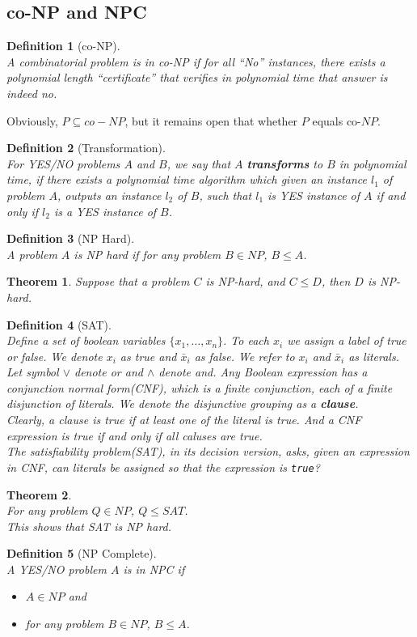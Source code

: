 \documentclass[12pt]{article}
\newtheorem{definition}{Definition}[section]
\newtheorem{theorem}{Theorem}[section]
\theoremstyle{definition}
\begin{document}
\subsection{co-NP and NPC}
\begin{definition}[co-NP]
\hfill\\\normalfont A combinatorial problem is in co-NP if for all ``No'' instances, there exists a polynomial length ``certificate'' that verifies in polynomial time that answer is indeed no. 
\end{definition}
Obviously, $P\subseteq co-NP$, but it remains open that whether $P$ equals co-$NP$.
\begin{definition}[Transformation]
\hfill\\\normalfont For YES/NO problems $A$ and $B$, we say that $A$ \textbf{transforms} to $B$ in polynomial time, if there exists a polynomial time algorithm which given an instance $l_1$ of problem $A$, outputs an instance $l_2$ of $B$, such that $l_1$ is YES instance of $A$ if and only if $l_2$ is a YES instance of $B$.
\end{definition}
\begin{definition}[NP Hard]
\hfill\\\normalfont A problem $A$ is NP hard if for any problem $B\in NP$, $B\leq A$.
\end{definition}
\begin{theorem}\normalfont Suppose that a problem $C$ is NP-hard, and $C\leq D$, then $D$ is NP-hard.
\end{theorem}
\begin{definition}[SAT]
\hfill\\\normalfont Define a set of boolean variables $\{x_1,\ldots, x_n\}$. To each $x_i$ we assign a label of true or false. We denote $x_i$ as true and $\bar{x}_i$ as false. We refer to $x_i$ and $\bar{x}_i$ as literals.\\
Let symbol $\lor$ denote or and $\land$ denote and. Any Boolean expression has a conjunction normal form(CNF), which is a finite conjunction, each of a finite disjunction of literals. We denote the disjunctive grouping as a \textbf{clause}.\\
Clearly, a clause is true if at least one of the literal is true. And a CNF expression is true if and only if all caluses are true.\\
The satisfiability problem(SAT), in its decision version, asks, given an expression in CNF, can literals be assigned so that the expression is \texttt{true}?
\end{definition}
\begin{theorem}
\hfill\\\normalfont For any problem $Q\in NP$, $Q\leq SAT$.\\
This shows that SAT is NP hard.
\end{theorem}
\begin{definition}[NP Complete]
\hfill\\\normalfont A YES/NO problem $A$ is in NPC if
\begin{itemize}
  \item $A\in NP$ and
  \item for any problem $B\in NP$, $B\leq A$.
  \end{itemize}
  \end{definition}
\end{document}
